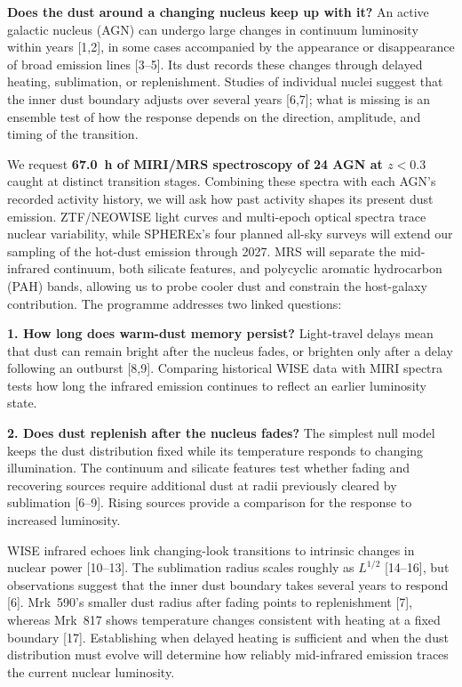 \documentclass[12pt]{article}
\newcommand{\proposalheading}[1]{%
  \par%
  \noindent\textcolor{sectionblue}{\textbf{#1}}\enspace\ignorespaces}
\begin{document}
\scientificjustification

\proposalheading{Does the dust around a changing nucleus keep up with it?}
An active galactic nucleus (AGN) can undergo large changes in continuum luminosity within years [1,2], in some cases accompanied by the appearance or disappearance of broad emission lines [3--5]. Its dust records these changes through delayed heating, sublimation, or replenishment. Studies of individual nuclei suggest that the inner dust boundary adjusts over several years [6,7]; what is missing is an ensemble test of how the response depends on the direction, amplitude, and timing of the transition.

We request \textbf{67.0~h of MIRI/MRS spectroscopy of 24 AGN at $z<0.3$} caught at distinct transition stages. Combining these spectra with each AGN's recorded activity history, we will ask how past activity shapes its present dust emission. ZTF/NEOWISE light curves and multi-epoch optical spectra trace nuclear variability, while SPHEREx's four planned all-sky surveys will extend our sampling of the hot-dust emission through 2027. MRS will separate the mid-infrared continuum, both silicate features, and polycyclic aromatic hydrocarbon (PAH) bands, allowing us to probe cooler dust and constrain the host-galaxy contribution. The programme addresses two linked questions:

\noindent\textbf{1. How long does warm-dust memory persist?} Light-travel delays mean that dust can remain bright after the nucleus fades, or brighten only after a delay following an outburst [8,9]. Comparing historical WISE data with MIRI spectra tests how long the infrared emission continues to reflect an earlier luminosity state.

\noindent\textbf{2. Does dust replenish after the nucleus fades?} The simplest null model keeps the dust distribution fixed while its temperature responds to changing illumination. The continuum and silicate features test whether fading and recovering sources require additional dust at radii previously cleared by sublimation [6--9]. Rising sources provide a comparison for the response to increased luminosity.

WISE infrared echoes link changing-look transitions to intrinsic changes in nuclear power [10--13]. The sublimation radius scales roughly as $L^{1/2}$ [14--16], but observations suggest that the inner dust boundary takes several years to respond [6]. Mrk~590's smaller dust radius after fading points to replenishment [7], whereas Mrk~817 shows temperature changes consistent with heating at a fixed boundary [17]. Establishing when delayed heating is sufficient and when the dust distribution must evolve will determine how reliably mid-infrared emission traces the current nuclear luminosity.
\end{document}
